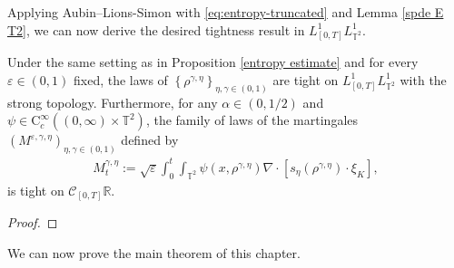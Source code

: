 Applying Aubin--Lions-Simon with \eqref{eq:entropy-truncated} and Lemma \ref{spde E T2}, we can now derive the desired tightness result in $L^1_{[0,T]}L^1_{\mathbb{T}^2}$.

\begin{prop}\label{T rho eta}
Under the same setting as in Proposition \ref{entropy estimate} and for every $\varepsilon \in (0,1)$ fixed, the laws of $\left\{\rho^{\gamma, \eta}\right\}_{\eta ,\gamma \in(0,1)}$ are tight on $L^1_{[0,T]}L^1_{\mathbb{T}^2}$ with the strong topology. Furthermore, for any $\alpha \in(0,1 / 2)$ and $\psi \in \mathrm{C}_c^{\infty}((0, \infty) \times \mathbb{T}^2)$, the family of laws of the martingales $(M^{\varepsilon, \gamma,\eta})_{\eta,\gamma\in(0,1)}$ defined by
 \begin{align}\label{D M}
 M_t^{\gamma,\eta}:=\sqrt{\varepsilon}\int_0^t \int_{\mathbb{T}^2} \psi\left(x, \rho^{\gamma, \eta}\right) \nabla \cdot\left[s_{\eta}\left(\rho^{\gamma, \eta}\right) \cdot \xi_{K}\right],  
\end{align}
is tight on $\mathcal{C}_{[0, T]}\mathbb{R}$. 
\end{prop}
\begin{proof}
\end{proof}


We can now prove the main theorem of this chapter. 

